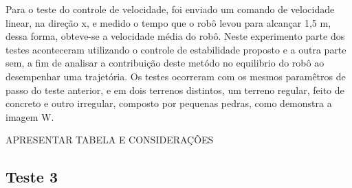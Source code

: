 \documentclass[../main.tex]{subfiles}
\begin{document}
  Para o teste do controle de velocidade, foi enviado um comando de velocidade linear, na direção x, e medido o tempo que o robô levou para alcançar 1,5 m, dessa forma, obteve-se a velocidade média do robô. Neste experimento parte dos testes aconteceram utilizando o controle de estabilidade proposto e a outra parte sem, a fim de analisar a contribuição deste metódo no equilibrio do robô ao desempenhar uma trajetória. Os testes ocorreram com os mesmos paramêtros de passo do teste anterior, e em dois terrenos distintos, um terreno regular, feito de concreto e outro irregular, composto por pequenas pedras, como demonstra a imagem W.

  APRESENTAR TABELA E CONSIDERAÇÕES
  
  \subsection{Teste 3}

    
\end{document}

